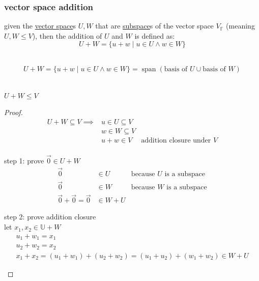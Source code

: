 \documentclass[a4paper,12pt]{article}
\DeclareMathOperator{\spn}{span}
\begin{document}
\subsubsection{vector space addition}
\label{sec:orga69c64e}
\begin{definition}
given the \hyperref[sec:orgea93933]{vector space}s \(U,W\) that are \hyperref[sec:org3f77751]{subspace}s of the vector space \(V_\mathbb{F}\) (meaning \(U,W \leq V\)), then the addition of \(U\) and \(W\) is defined as:\\
\[
  U + W = \{u+w \mid u \in U \land w \in W\}
\]\\

\begin{lemma}
\[
  U + W = \{u+w \mid u \in U \land w \in W\} = \spn(\text{basis of }U \cup \text{basis of } W)
\]\\
\end{lemma}
\begin{lemma}
\(U + W \leq V\)\\
\begin{proof}
\begin{align*}
  U + W \subseteq V \implies &u \in U \subseteq V\\
                             &w \in W \subseteq V\\
                             &u + w \in V &\text{addition closure under } V\\
\end{align*}
\begin{step}
step 1: prove \(\vec0 \in U + W\)\\
\begin{align*}
  \vec0 &\in U &\text{because $U$ is a subspace}\\
  \vec0 &\in W &\text{because $W$ is a subspace}\\
  \vec0 + \vec0 = \vec0 &\in W + U
\end{align*}
\end{step}
\begin{step}
step 2: prove addition closure\\
let \(x_1, x_2 \in \mathbb{U} + W\)\\
\begin{gather*}
  u_1 + w_1 = x_1\\
  u_2 + w_2 = x_2\\
  x_1 + x_2 = (u_1 + w_1) + (u_2 + w_2) = (u_1 + u_2) + (w_1 + w_2) \in W + U
\end{gather*}
\end{step}
\begin{step}

\end{step}
\end{proof}
\end{lemma}
\end{definition}
\end{document}
